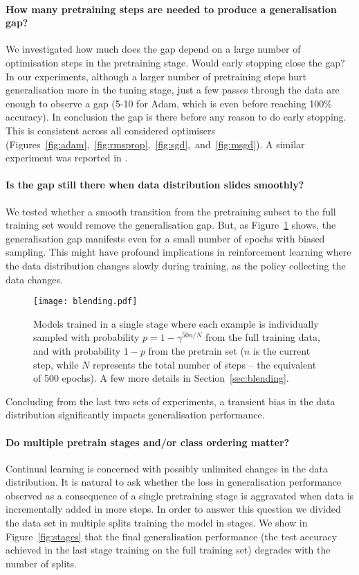 \paragraph{How many pretraining steps are needed to produce a generalisation gap?} We investigated how much does the gap depend on a large number of optimisation steps in the pretraining stage. Would early stopping close the gap? In our experiments, although a larger number of pretraining steps hurt generalisation more in the tuning stage, just a few passes through the data are enough to observe a gap (5-10 for Adam, which is even before reaching 100\% accuracy). In conclusion the gap is there before any reason to do early stopping. This is consistent across all considered optimisers (Figures~\ref{fig:adam},~\ref{fig:rmsprop},~\ref{fig:sgd},~and~\ref{fig:msgd}). A similar experiment was reported in \cite{ash2019difficulty}.

\paragraph{Is the gap still there when data distribution slides smoothly?}
We tested whether a smooth transition from the pretraining subset to the full training set would remove the generalisation gap. But, as Figure~\ref{fig:blending} shows, the generalisation gap manifests even for a small number of epochs with biased sampling. This might have profound implications in reinforcement learning where the data distribution changes slowly during training, as the policy collecting the data changes.


\begin{figure}[h!tb]
    \centering%
    \texttt{[image: blending.pdf]}
    \caption{Models trained in a single stage where each example is individually sampled with probability $p=1-\gamma^{50 n/N}$ from the full training data, and with probability $1-p$ from the pretrain set ($n$ is the current step, while $N$ represents the total number of steps -- the equivalent of 500 epochs). A few more details in Section~\ref{sec:blending}.}
    \label{fig:blending}
\end{figure}

Concluding from the last two sets of experiments, a transient bias in the data distribution significantly impacts generalisation performance.


\paragraph{Do multiple pretrain stages and/or class ordering matter?} Continual learning is concerned with possibly unlimited changes in the data distribution. It is natural to ask whether the loss in generalisation performance observed as a consequence of a single pretraining stage is aggravated when data is incrementally added in more steps. In order to answer this question we divided the data set in multiple splits training the model in stages. We show in Figure~\ref{fig:stages} that the final generalisation performance (the test accuracy achieved in the last stage training on the full training set) degrades with the number of splits.

